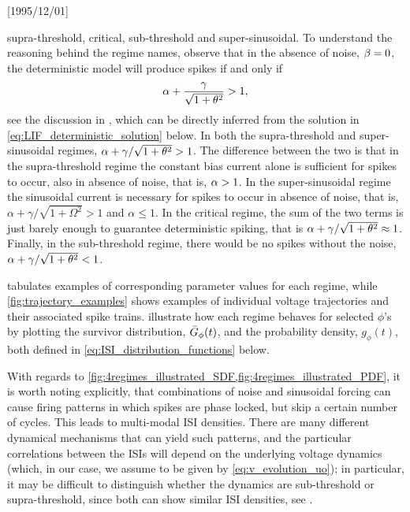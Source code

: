 \NeedsTeXFormat{LaTeX2e}[1995/12/01] \documentclass[10pt]{bmc_article}
\newenvironment{bmcformat}{\begin{raggedright}\baselineskip20pt\sloppy\setboolean{publ}{false}}{\end{raggedright}\baselineskip20pt\sloppy}
\begin{document}
\begin{bmcformat}
supra-threshold, critical, sub-threshold and super-sinusoidal. 
To understand the reasoning behind the regime names, observe that in the absence
of noise, ${\beta}=0$, the deterministic model will produce spikes if and only if $$
{\alpha} + \frac{{\gamma }}{\sqrt{1 + {\theta}^2} } > 1, $$ see the discussion in
\cite{Burkitt2006b}, which can be directly inferred from the solution in
\cref{eq:LIF_deterministic_solution} below. In both the supra-threshold and
super-sinusoidal regimes, $ {\alpha} + {\gamma }/\sqrt{1 + {\theta}^2}  > 1$. The
difference between the two is that in the supra-threshold regime the constant
bias current alone is sufficient for spikes to occur, also in absence of noise,
that is,  ${\alpha} > 1$. In the super-sinusoidal regime the sinusoidal current is
necessary for spikes to occur in absence of noise, that is, $\alpha +
\gamma /
\sqrt{1+\Omega^2} > 1$ and $\alpha \leq 1$. In the critical regime, the sum of
the two terms is just barely enough to guarantee deterministic spiking, that is
${\alpha} + {\gamma } / \sqrt{1 + {\theta}^2}  \approx 1$. Finally, in the sub-threshold regime,
there would be no spikes without the noise, $ {\alpha} + {\gamma } / \sqrt{1 + {\theta}^2} < 1$.

 tabulates examples of corresponding parameter values for each
regime, while \cref{fig:trajectory_examples} shows examples of individual
voltage trajectories and their associated spike trains.
 illustrate
 how each regime behaves for selected $\phi$'s by plotting the survivor
 distribution, ${ \bar{G} }_{\phi}(t)$, and the probability density, $g_{\phi}(t)$, both
 defined in \cref{eq:ISI_distribution_functions} below.
 
With regards to
\cref{fig:4regimes_illustrated_SDF,fig:4regimes_illustrated_PDF}, it is worth
noting explicitly, that combinations of noise and sinusoidal forcing can cause
firing patterns in which spikes are phase locked, but skip a certain number of
cycles. This leads to multi-modal ISI densities. There are many different
dynamical mechanisms that can yield such patterns, and the particular
correlations between the ISIs will depend on the underlying voltage dynamics
(which, in our case, we assume to be given by \cref{eq:v_evolution_uo}); in
particular, it may be difficult to distinguish whether the dynamics are
sub-threshold or supra-threshold, since both can show similar ISI densities,
see \cite{Longtin1995}.


 

\clearpage


\end{bmcformat}
\end{document}
